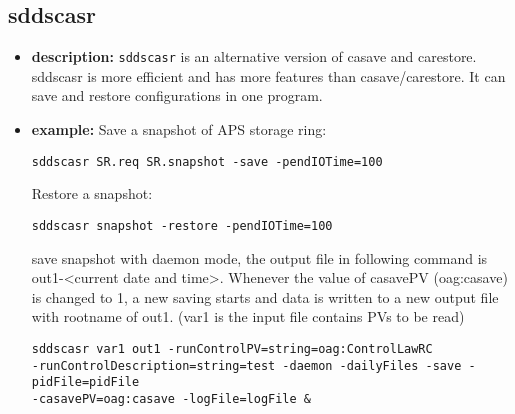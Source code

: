 %
%
\begin{latexonly}
\newpage
\end{latexonly}

%
%
\subsection{sddscasr}
\label{sddscasr}

\begin{itemize}
\item {\bf description:}
%
%
\verb+sddscasr+ is an alternative version of casave and carestore. sddscasr is
more efficient and has more features than casave/carestore. It can save
and restore configurations in one program.

\item {\bf example:} 
%
% 
%
Save a snapshot of APS storage ring:
\begin{verbatim}
sddscasr SR.req SR.snapshot -save -pendIOTime=100
\end{verbatim}
Restore a snapshot:
\begin{verbatim}
sddscasr snapshot -restore -pendIOTime=100
\end{verbatim}
save snapshot with daemon mode, the output file in following command is out1-<current date and time>.
Whenever the value of casavePV (oag:casave) is changed to 1, a new saving starts and data is written
to a new output file with rootname of out1. (var1 is the input file contains PVs to be read)
\begin{verbatim}
sddscasr var1 out1 -runControlPV=string=oag:ControlLawRC
-runControlDescription=string=test -daemon -dailyFiles -save -pidFile=pidFile
-casavePV=oag:casave -logFile=logFile &
\end{verbatim}


\end{itemize}
